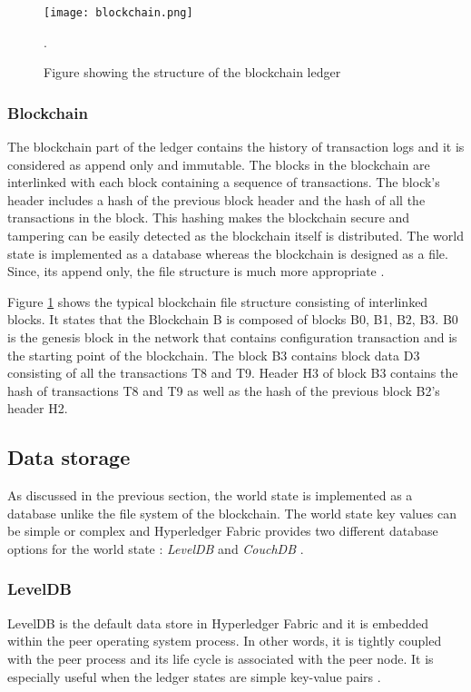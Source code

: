 \documentclass[
  a4paper,  %
  twoside,  %
  bibliography=totoc,
  headsepline,
  cleardoublepage=empty,
  parskip=half,
  draft=false
]{scrbook}
\begin{document}
\begin{figure}[b!]
\begin{center}
\texttt{[image: blockchain.png]}
\caption{Figure showing the structure of the blockchain ledger \cite{Ledger}}.
\label{fig:blockchain}
\end{center}
\end{figure}

\subsubsection{Blockchain}
The blockchain part of the ledger contains the history of transaction logs and it is considered as append only and immutable. The blocks in the blockchain are interlinked with each block containing a sequence of transactions. The block's header includes a hash of the previous block header and the hash of all the transactions in the block. This hashing makes the blockchain secure and tampering can be easily detected as the blockchain itself is distributed. The world state is implemented as a database whereas the blockchain is designed as a file. Since, its append only, the file structure is much more appropriate \cite{Ledger}.

Figure \ref{fig:blockchain} shows the typical blockchain file structure consisting of interlinked blocks. It states that the Blockchain B is composed of blocks B0, B1, B2, B3. B0 is the genesis block in the network that contains configuration transaction and is the starting point of the blockchain. The block B3 contains block data D3 consisting of all the transactions T8 and T9. Header H3 of block B3 contains the hash of transactions T8 and T9 as well as the hash of the previous block B2's header H2.


\subsection{Data storage}
As discussed in the previous section, the world state is implemented as a database unlike the file system of the blockchain. The world state key values can be simple or complex and Hyperledger Fabric provides two different database options for the world state : \textit{LevelDB} \cite{ldb} and \textit{CouchDB} \cite{cdb}.

\subsubsection{LevelDB}
LevelDB is the default data store in Hyperledger Fabric and it is embedded within the peer operating system process. In other words, it is tightly coupled with the peer process and its life cycle is associated with the peer node. It is especially useful when the ledger states are simple key-value pairs \cite{Ledger}.
\end{document}
